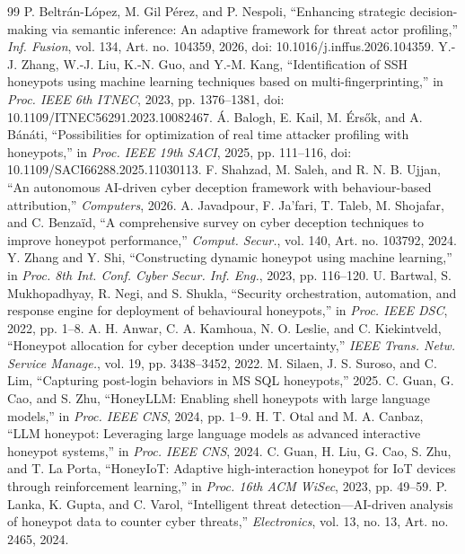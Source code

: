 \documentclass[conference]{IEEEtran}
\begin{document}
\begin{thebibliography}{99}
 P. Beltr\'an-L\'opez, M. Gil P\'erez, and P. Nespoli, ``Enhancing strategic decision-making via semantic inference: An adaptive framework for threat actor profiling,'' \emph{Inf. Fusion}, vol. 134, Art. no. 104359, 2026, doi: 10.1016/j.inffus.2026.104359.
 Y.-J. Zhang, W.-J. Liu, K.-N. Guo, and Y.-M. Kang, ``Identification of SSH honeypots using machine learning techniques based on multi-fingerprinting,'' in \emph{Proc. IEEE 6th ITNEC}, 2023, pp. 1376--1381, doi: 10.1109/ITNEC56291.2023.10082467.
 \'A. Balogh, E. Kail, M. \'Ers\H{o}k, and A. B\'an\'ati, ``Possibilities for optimization of real time attacker profiling with honeypots,'' in \emph{Proc. IEEE 19th SACI}, 2025, pp. 111--116, doi: 10.1109/SACI66288.2025.11030113.
 F. Shahzad, M. Saleh, and R. N. B. Ujjan, ``An autonomous AI-driven cyber deception framework with behaviour-based attribution,'' \emph{Computers}, 2026.
 A. Javadpour, F. Ja'fari, T. Taleb, M. Shojafar, and C. Benza\"id, ``A comprehensive survey on cyber deception techniques to improve honeypot performance,'' \emph{Comput. Secur.}, vol. 140, Art. no. 103792, 2024.
 Y. Zhang and Y. Shi, ``Constructing dynamic honeypot using machine learning,'' in \emph{Proc. 8th Int. Conf. Cyber Secur. Inf. Eng.}, 2023, pp. 116--120.
 U. Bartwal, S. Mukhopadhyay, R. Negi, and S. Shukla, ``Security orchestration, automation, and response engine for deployment of behavioural honeypots,'' in \emph{Proc. IEEE DSC}, 2022, pp. 1--8.
 A. H. Anwar, C. A. Kamhoua, N. O. Leslie, and C. Kiekintveld, ``Honeypot allocation for cyber deception under uncertainty,'' \emph{IEEE Trans. Netw. Service Manage.}, vol. 19, pp. 3438--3452, 2022.
 M. Silaen, J. S. Suroso, and C. Lim, ``Capturing post-login behaviors in MS SQL honeypots,'' 2025.
 C. Guan, G. Cao, and S. Zhu, ``HoneyLLM: Enabling shell honeypots with large language models,'' in \emph{Proc. IEEE CNS}, 2024, pp. 1--9.
 H. T. Otal and M. A. Canbaz, ``LLM honeypot: Leveraging large language models as advanced interactive honeypot systems,'' in \emph{Proc. IEEE CNS}, 2024.
 C. Guan, H. Liu, G. Cao, S. Zhu, and T. La Porta, ``HoneyIoT: Adaptive high-interaction honeypot for IoT devices through reinforcement learning,'' in \emph{Proc. 16th ACM WiSec}, 2023, pp. 49--59.
 P. Lanka, K. Gupta, and C. Varol, ``Intelligent threat detection---AI-driven analysis of honeypot data to counter cyber threats,'' \emph{Electronics}, vol. 13, no. 13, Art. no. 2465, 2024.

\end{thebibliography}
\end{document}
